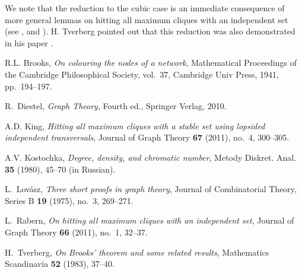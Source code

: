 \documentclass[note]{dmgt}
\begin{document}
We note that the reduction to the cubic case is an immediate consequence of more
general lemmas on hitting all maximum cliques with an independent set
(see \cite{kostochkaRussian}, \cite{rabernhitting} and \cite{KingHitting}).  H.
Tverberg pointed out that this reduction was also demonstrated in his paper
\cite{tverberg1983brooks}.

\begin{thebibliography}{99}

R.L. Brooks, \emph{{On colouring the nodes of a network}}, Mathematical
  Proceedings of the Cambridge Philosophical Society, vol.~37, Cambridge Univ
  Press, 1941, pp.~194--197.

R.~Diestel, \emph{{Graph Theory}}, {Fourth} ed., Springer Verlag, 2010.

A.D. King, \emph{Hitting all maximum cliques with a stable set using lopsided
  independent transversals}, Journal of Graph Theory \textbf{67} (2011), no.~4,
  300--305.

A.V. Kostochka, \emph{{Degree, density, and chromatic number}}, Metody Diskret.
  Anal. \textbf{35} (1980), 45--70 (in Russian).

L.~Lov\'{a}sz, \emph{Three short proofs in graph theory}, Journal of
  Combinatorial Theory, Series B \textbf{19} (1975), no.~3, 269--271.

L.~Rabern, \emph{{On hitting all maximum cliques with an independent set}},
  Journal of Graph Theory \textbf{66} (2011), no.~1, 32--37.

H.~Tverberg, \emph{{On Brooks' theorem and some related results}}, Mathematics
  Scandinavia \textbf{52} (1983), 37--40.

\end{thebibliography}
\end{document}
